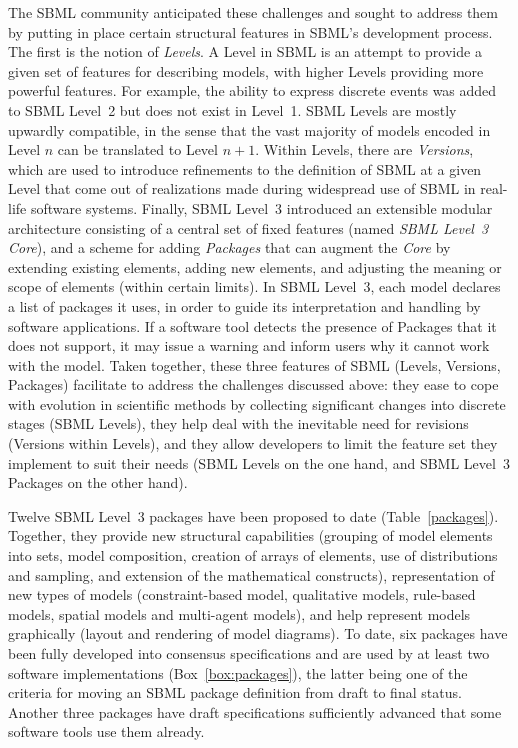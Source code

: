 \documentclass[]{draft-sbml-paper}
\begin{document}
The SBML community anticipated these challenges and sought to address them by putting in place certain structural features in SBML's development process.  The first is the notion of \emph{Levels}.  A Level in SBML is an attempt to provide a given set of features for describing models, with higher Levels providing more powerful features.  For example, the ability to express discrete events was added to SBML Level~2 but does not exist in Level~1.  SBML Levels are mostly upwardly compatible, in the sense that the vast majority of models encoded in Level $n$ can be translated to Level $n+1$.  Within Levels, there are \emph{Versions}, which are used to introduce refinements to the definition of SBML at a given Level that come out of realizations made during widespread use of SBML in real-life software systems.  Finally, SBML Level~3 introduced an extensible modular architecture consisting of a central set of fixed features (named \emph{SBML Level~3 Core}), and a scheme for adding \emph{Packages} that can augment the \emph{Core} by extending existing elements, adding new elements, and adjusting the meaning or scope of elements (within certain limits).  In SBML Level~3, each model declares a list of packages it uses, in order to guide its interpretation and handling by software applications.  If a software tool detects the presence of Packages that it does not support, it may issue a warning and inform users why it cannot work with the model.  Taken together, these three features of SBML (Levels, Versions, Packages) facilitate to address the challenges discussed above: they ease to cope with evolution in scientific methods by collecting significant changes into discrete stages (SBML Levels), they help deal with the inevitable need for revisions (Versions within Levels), and they allow developers to limit the feature set they implement to suit their needs (SBML Levels on the one hand, and SBML Level~3 Packages on the other hand).

Twelve SBML Level~3 packages have been proposed to date (Table~\ref{packages}). Together, they provide new structural capabilities (grouping of model elements into sets, model composition, creation of arrays of elements, use of distributions and sampling, and extension of the mathematical constructs), representation of new types of models (constraint-based model, qualitative models, rule-based models, spatial models and multi-agent models), and help represent models graphically (layout and rendering of model diagrams).  To date, six packages have been fully developed into consensus specifications and are used by at least two software implementations (Box~\ref{box:packages}), the latter being one of the criteria for moving an SBML package definition from draft to final status. Another three packages have draft specifications sufficiently advanced that some software tools use them already.
\end{document}
